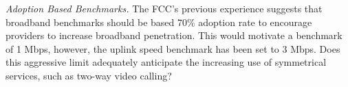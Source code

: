  \emph{Adoption Based Benchmarks.} The FCC's previous experience suggests that broadband benchmarks should be based 70\% adoption rate to encourage providers to increase broadband penetration. This would motivate a benchmark of 1 Mbps, however, the uplink speed benchmark has been set to 3 Mbps. Does this aggressive limit adequately anticipate the increasing use of symmetrical services, such as two-way video calling?
